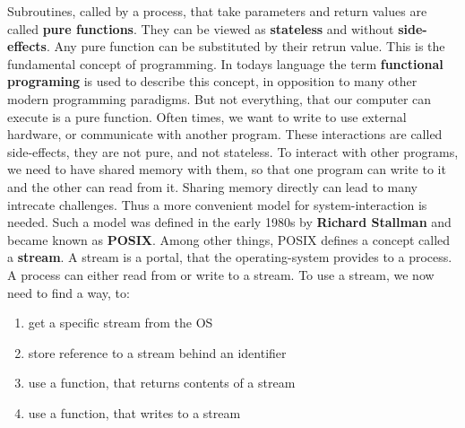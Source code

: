 \documentclass{dcbl/challenge}
\begin{document}
Subroutines, called by a process, that take parameters and return values are called \textbf{pure functions}.
They can be viewed as \textbf{stateless} and without \textbf{side-effects}.
Any pure function can be substituted by their retrun value.
This is the fundamental concept of programming.
In todays language the term \textbf{functional programing} is used to describe this concept, in opposition to many other modern programming paradigms.
But not everything, that our computer can execute is a pure function.
Often times, we want to write to use external hardware, or communicate with another program.
These interactions are called side-effects, they are not pure, and not stateless.
To interact with other programs, we need to have shared memory with them, so that one program can write to it and the other can read from it.
Sharing memory directly can lead to many intrecate challenges.
Thus a more convenient model for system-interaction is needed.
Such a model was defined in the early 1980s by \textbf{Richard Stallman} and became known as \textbf{POSIX}.
Among other things, POSIX defines a concept called a \textbf{stream}.
A stream is a portal, that the operating-system provides to a process. 
A process can either read from or write to a stream.
To use a stream, we now need to find a way, to:
\begin{enumerate}
    \item get a specific stream from the OS
    \item store reference to a stream behind an identifier
    \item use a function, that returns contents of a stream
    \item use a function, that writes to a stream
\end{enumerate} 
\end{document}

